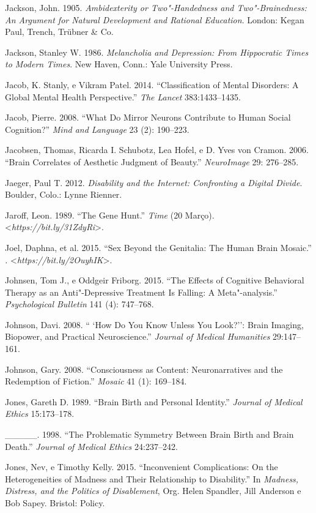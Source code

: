 {\begin{Parskip}
Jackson, John. 1905. \emph{Ambidexterity or Two"-Handedness and
Two"-Brainedness: An Argument for Natural Development and Rational
Education}. London: Kegan Paul, Trench, Trübner \& Co.

Jackson, Stanley W. 1986. \emph{Melancholia and Depression: From
Hippocratic Times to Modern Times}. New Haven, Conn.: Yale University
Press.

Jacob, K. Stanly, e Vikram Patel. 2014. ``Classification of Mental
Disorders: A Global Mental Health Perspective.'' \emph{The Lancet}
383:1433--1435.

Jacob, Pierre. 2008. ``What Do Mirror Neurons Contribute to Human Social
Cognition?'' \emph{Mind and Language} 23 (2): 190--223.

Jacobsen, Thomas, Ricarda I. Schubotz, Lea Hofel, e D. Yves von Cramon.
2006. ``Brain Correlates of Aesthetic Judgment of Beauty.''
\emph{NeuroImage} 29: 276--285.

Jaeger, Paul T. 2012. \emph{Disability and the Internet: Confronting a
Digital Divide}. Boulder, Colo.: Lynne Rienner.

Jaroff, Leon. 1989. ``The Gene Hunt.'' \emph{Time} (20 Março).
\textless{}\emph{https://bit.ly/31ZdyRi}\textgreater{}.

Joel, Daphna, et al. 2015. ``Sex Beyond the Genitalia: The Human Brain
Mosaic.'' \emph{.}
\textless{}\emph{https://bit.ly/2OuyhIK}\textgreater{}.

Johnsen, Tom J., e Oddgeir Friborg. 2015. ``The Effects of Cognitive
Behavioral Therapy as an Anti"-Depressive Treatment Is Falling: A
Meta"-analysis.'' \emph{Psychological Bulletin} 141 (4): 747--768.

Johnson, Davi. 2008. `` `How Do You Know Unless You Look?'': Brain
Imaging, Biopower, and Practical Neuroscience.'' \emph{Journal of
Medical Humanities} 29:147--161.

Johnson, Gary. 2008. ``Consciousness as Content: Neuronarratives and the
Redemption of Fiction.'' \emph{Mosaic} 41 (1): 169--184.

Jones, Gareth D. 1989. ``Brain Birth and Personal Identity.''
\emph{Journal of Medical Ethics} 15:173--178.

\_\_\_\_\_. 1998. ``The Problematic Symmetry Between Brain Birth and
Brain Death.'' \emph{Journal of Medical Ethics} 24:237--242.

Jones, Nev, e Timothy Kelly. 2015. ``Inconvenient Complications: On the
Heterogeneities of Madness and Their Relationship to Disability.'' In
\emph{Madness, Distress, and the Politics of Disablement}, Org. Helen
Spandler, Jill Anderson e Bob Sapey. Bristol: Policy.


\end{Parskip}}
